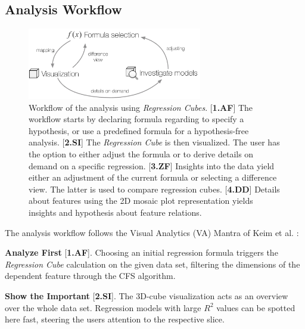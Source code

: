 \documentclass[journal]{style/vgtc} 			          %
\newcommand{\com}[1]{\textcolor{orange}{\uline{#1}}}
\begin{document}
\subsection{Analysis Workflow} \label{sec:Workflow}
\begin{figure}[htb]
 \centering
 \includegraphics[width=3.0in]{figures/workflow}
 \caption{
 Workflow of the analysis using \emph{Regression Cubes}.
 [\textbf{1.AF}] The workflow starts by declaring formula regarding to specify a hypothesis, or use a predefined formula for a hypothesis-free analysis.
 [\textbf{2.SI}] The \emph{Regression Cube} is then visualized.
 The user has the option to either adjust the formula or to derive details on demand on a specific regression.
 [\textbf{3.ZF}] Insights into the data yield either an adjustment of the current formula or selecting a difference view.
 The latter is used to compare regression cubes.
 [\textbf{4.DD}] Details about features using the 2D mosaic plot representation yields insights and hypothesis about feature relations.
 }
  \label{fig:Workflow}
\end{figure}
The analysis workflow follows the Visual Analytics (VA) Mantra of Keim et al. \cite{Keim}:

\textbf{Analyze First} [\textbf{1.AF}]. Choosing an initial regression formula triggers the \emph{Regression Cube} calculation on the given data set, filtering the dimensions of the dependent feature through the CFS algorithm.

\textbf{Show the Important} [\textbf{2.SI}]. The 3D-cube visualization acts as an overview over the whole data set.
Regression models with large $R^2$ values can be spotted here fast, steering the users attention to the respective slice.
\end{document}
